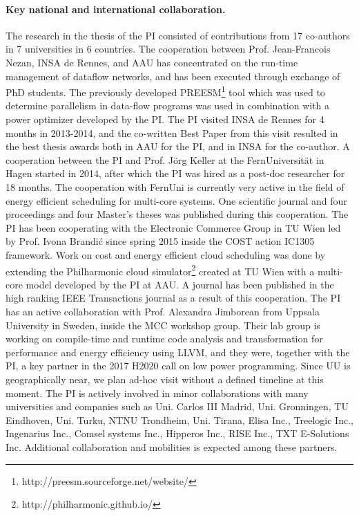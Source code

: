 \documentclass{article}
\begin{document}
\paragraph{Key national and international collaboration.}
The research in the thesis of the PI consisted of contributions from 17 co-authors in 7 universities in 6 countries.
The cooperation between Prof. Jean-Francois Nezan, INSA de Rennes, and AAU has concentrated on the run-time management of dataflow networks, 
and has been executed through exchange of PhD students.
The previously developed PREESM\footnote{http://preesm.sourceforge.net/website/} tool which was used to determine parallelism in data-flow programs was used in combination with a power optimizer developed by the PI. 
The PI visited INSA de Rennes for 4 months in 2013-2014, and the co-written Best Paper from this visit resulted in the best thesis awards both in AAU for the PI, and in INSA for the co-author.
A cooperation between the PI and Prof. J\"{o}rg Keller at the FernUniversit\"{a}t in Hagen started in 2014, after which the PI was hired as a post-doc researcher for 18 months.
The cooperation with FernUni is currently very active in the field of energy efficient scheduling for multi-core systems. 
One scientific journal and four proceedings and four Master's theses was published during this cooperation.
The PI has been cooperating with the Electronic Commerce Group in TU Wien led by Prof. Ivona Brandi\'{c} since spring 2015 inside the COST action IC1305 framework. 
Work on cost and energy efficient cloud scheduling was done by extending the Philharmonic cloud simulator\footnote{http://philharmonic.github.io/} created at TU Wien with a multi-core model developed by the PI at AAU. 
A journal has been published in the high ranking IEEE Transactions journal as a result of this cooperation.
The PI has an active collaboration with Prof. Alexandra Jimborean from Uppsala University in Sweden, inside the MCC workshop group.
Their lab group is working on compile-time and runtime code analysis and transformation for performance and energy efficiency using LLVM, and they were, together with the PI, a key partner in the 2017 H2020 call on low power programming.
Since UU is geographically near, we plan ad-hoc visit without a defined timeline at this moment.
The PI is actively involved in minor collaborations with many universities and companies such as Uni. Carlos III Madrid, Uni. Gronningen, TU Eindhoven, Uni. Turku, NTNU Trondheim, Uni. Tirana, Elisa Inc., Treelogic Inc., Ingenarius Inc., Comsel systems Inc., Hipperos Inc., RISE Inc., TXT E-Solutions Inc.
Additional collaboration and mobilities is expected among these partners.
\end{document}
